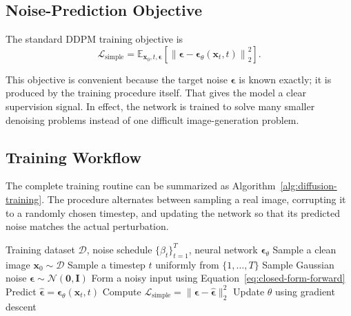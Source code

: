 \documentclass[a4paper,12pt]{article}
\newcommand{\vect}[1]{\bm{#1}}
\newcommand{\E}{\mathbb{E}}
\begin{document}
\subsection{Noise-Prediction Objective}
The standard DDPM training objective is
\begin{equation}
    \mathcal{L}_{\text{simple}}
    =
    \E_{\vect{x}_0,t,\vect{\epsilon}}
    \left[
        \left\|
            \vect{\epsilon} - \vect{\epsilon}_{\theta}(\vect{x}_t,t)
        \right\|_2^2
    \right].
    \label{eq:noise-objective}
\end{equation}

This objective is convenient because the target noise $\vect{\epsilon}$ is known exactly; it is produced by the training procedure itself. That gives the model a clear supervision signal. In effect, the network is trained to solve many smaller denoising problems instead of one difficult image-generation problem.

\subsection{Training Workflow}
The complete training routine can be summarized as Algorithm~\ref{alg:diffusion-training}. The procedure alternates between sampling a real image, corrupting it to a randomly chosen timestep, and updating the network so that its predicted noise matches the actual perturbation.

\begin{algorithm}[H]
\caption{Training a diffusion model with noise prediction}
\label{alg:diffusion-training}
\begin{algorithmic}[1]
\Require Training dataset $\mathcal{D}$, noise schedule $\{\beta_t\}_{t=1}^{T}$, neural network $\vect{\epsilon}_{\theta}$
    \State Sample a clean image $\vect{x}_0 \sim \mathcal{D}$
    \State Sample a timestep $t$ uniformly from $\{1,\dots,T\}$
    \State Sample Gaussian noise $\vect{\epsilon} \sim \mathcal{N}(\vect{0},\vect{I})$
    \State Form a noisy input using Equation~\ref{eq:closed-form-forward}
    \State Predict $\hat{\vect{\epsilon}} = \vect{\epsilon}_{\theta}(\vect{x}_t,t)$
    \State Compute $\mathcal{L}_{\text{simple}} = \|\vect{\epsilon} - \hat{\vect{\epsilon}}\|_2^2$
    \State Update $\theta$ using gradient descent
\EndWhile
\end{algorithmic}
\end{algorithm}
\end{document}

